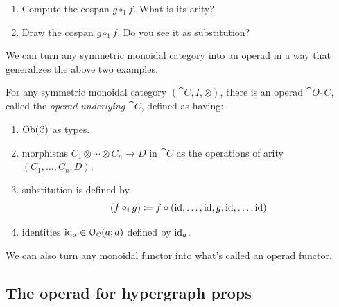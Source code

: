 \documentclass[7Sketches]{subfiles}
\begin{document}
\begin{exercise}
\begin{enumerate}
\[\begin{tikzpicture}[x=.25cm, y=.75cm,short=2pt]
\begin{scope}[every node/.style={draw, inner sep=1.5pt, fill, circle}]
			\node[right=1 of b2] (b3) {};
		\end{scope}
		\node at ($(b2)+(0,-1.25)$) {$\varnothing$};
		\begin{scope}[every node/.style={draw, rounded corners, gray, inner ysep=7pt, inner xsep=5pt}]
  	  \node [fit=(a11) (a12)] {};
  	  \node [fit=(a21) (a22)] {};
  	  \node [fit=(a31) (a32)] {};
			\node [fit=(b1) (b3)] {};
		\end{scope}
		\begin{scope}[mapsto]
			\draw (a11) -- (b2);
			\draw (a12) -- (b1);
			\draw (a21) -- (b1);
			\draw (a22) -- (b3);
			\draw (a31) -- (b3);
			\draw (a32) -- (b2);
		\end{scope}
	\end{tikzpicture}
	\]	
	\item Compute the cospan $g\circ_1 f$. What is its arity?
	\item Draw the cospan $g\circ_1 f$. Do you see it as substitution?
\qedhere
\end{enumerate}
\end{exercise}


We can turn any symmetric monoidal category into an operad in a way that
generalizes the above two examples.

\begin{definition}%
\label{def.underlying_operad}
For any symmetric monoidal category $(\cat{C},I,\otimes)$, there is an operad $\cat{O}_\cat{C}$, called the \emph{operad underlying $\cat{C}$}, defined as having:
\begin{enumerate}[label=(\roman*)]
	\item $\operatorname{Ob}(\mathcal{C})$ as types.
	\item morphisms $C_1\otimes\cdots\otimes C_n\to D$ in $\cat{C}$ as the operations of arity $(C_1,\ldots,C_n;D)$.
	\item substitution is defined by
	\[(f\circ_ig)\coloneqq f\circ(\mathrm{id},\ldots,\mathrm{id},g,\mathrm{id},\ldots,\mathrm{id})\]
	\item identities $\mathrm{id}_a\in\mathcal{O}_{\mathcal{C}}(a;a)$ defined by $\mathrm{id}_a$.
\end{enumerate}
\end{definition}
We can also turn any monoidal functor into what's called an operad functor.

\subsection{The operad for hypergraph props}%
\end{document}
